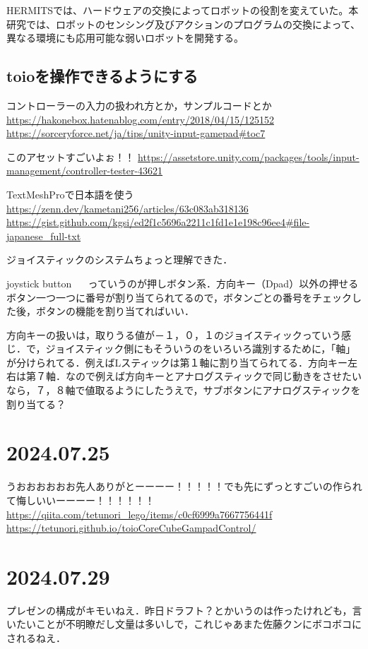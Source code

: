 \documentclass[fleqn,twocolumn]{mynote}
\begin{document}
  HERMITSでは、ハードウェアの交換によってロボットの役割を変えていた。本研究では、ロボットのセンシング及びアクションのプログラムの交換によって、異なる環境にも応用可能な弱いロボットを開発する。

  \subsection{toioを操作できるようにする}
  コントローラーの入力の扱われ方とか，サンプルコードとか
  \url{https://hakonebox.hatenablog.com/entry/2018/04/15/125152}
  \url{https://sorceryforce.net/ja/tips/unity-input-gamepad#toc7}

  このアセットすごいよぉ！！
  \url{https://assetstore.unity.com/packages/tools/input-management/controller-tester-43621}

  TextMeshProで日本語を使う
  \url{https://zenn.dev/kametani256/articles/63c083ab318136}
  \url{https://gist.github.com/kgsi/ed2f1c5696a2211c1fd1e1e198c96ee4#file-japanese_full-txt}

  ジョイスティックのシステムちょっと理解できた．

  joystick button ~~
  っていうのが押しボタン系．方向キー（Dpad）以外の押せるボタン一つ一つに番号が割り当てられてるので，ボタンごとの番号をチェックした後，ボタンの機能を割り当てればいい．

  方向キーの扱いは，取りうる値が－１，０，１のジョイスティックっていう感じ．で，ジョイスティック側にもそういうのをいろいろ識別するために，「軸」が分けられてる．例えばLスティックは第１軸に割り当てられてる．方向キー左右は第７軸．なので例えば方向キーとアナログスティックで同じ動きをさせたいなら，７，８軸で値取るようにしたうえで，サブボタンにアナログスティックを割り当てる？

  \section*{2024.07.25}
  うおおおおおお先人ありがとーーーー！！！！！でも先にずっとすごいの作られて悔しいいーーーー！！！！！！
  \url{https://qiita.com/tetunori_lego/items/c0cf6999a7667756441f}
  \url{https://tetunori.github.io/toioCoreCubeGampadControl/}

  \section*{2024.07.29}
  プレゼンの構成がキモいねえ．昨日ドラフト？とかいうのは作ったけれども，言いたいことが不明瞭だし文量は多いしで，これじゃあまた佐藤クンにボコボコにされるねえ．
\end{document}
